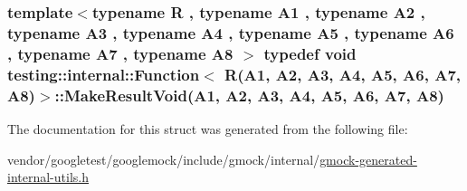\subsubsection[{\texorpdfstring{Make\+Result\+Void}{MakeResultVoid}}]{\setlength{\rightskip}{0pt plus 5cm}template$<$typename R , typename A1 , typename A2 , typename A3 , typename A4 , typename A5 , typename A6 , typename A7 , typename A8 $>$ typedef void {\bf testing\+::internal\+::\+Function}$<$ R(A1, A2, A3, A4, A5, A6, A7, A8)$>$\+::Make\+Result\+Void(A1, A2, A3, A4, A5, A6, A7, A8)}\hypertarget{structtesting_1_1internal_1_1Function_3_01R_07A1_00_01A2_00_01A3_00_01A4_00_01A5_00_01A6_00_01A7_00_01A8_08_4_a421404d7553350ee8a1890a21d9fbc55}{}\label{structtesting_1_1internal_1_1Function_3_01R_07A1_00_01A2_00_01A3_00_01A4_00_01A5_00_01A6_00_01A7_00_01A8_08_4_a421404d7553350ee8a1890a21d9fbc55}


The documentation for this struct was generated from the following file\+:\begin{DoxyCompactItemize}
\item 
vendor/googletest/googlemock/include/gmock/internal/\hyperlink{gmock-generated-internal-utils_8h}{gmock-\/generated-\/internal-\/utils.\+h}\end{DoxyCompactItemize}
